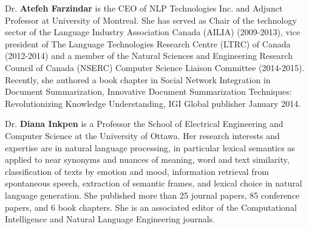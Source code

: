 \begin{bio}

Dr. \textbf{Atefeh Farzindar} is the CEO of NLP Technologies Inc.
and Adjunct Professor at University of Montreal. She has served as
Chair of the technology sector of the Language Industry Association
Canada (AILIA) (2009-2013), vice president of The Language Technologies
Research Centre (LTRC) of Canada (2012-2014) and a member of the Natural
Sciences and Engineering Research Council of Canada (NSERC) Computer
Science Liaison Committee (2014-2015). Recently, she authored a book
chapter in Social Network Integration in Document Summarization, Innovative
Document Summarization Techniques: Revolutionizing Knowledge Understanding,
IGI Global publisher January 2014.

Dr. \textbf{Diana Inkpen} is a Professor the School of Electrical
Engineering and Computer Science at the University of Ottawa. Her
research interests and expertise are in natural language processing,
in particular lexical semantics as applied to near synonyms and nuances
of meaning, word and text similarity, classification of texts by emotion
and mood, information retrieval from spontaneous speech, extraction
of semantic frames, and lexical choice in natural language generation.
She published more than 25 journal papers, 85 conference papers, and
6 book chapters. She is an associated editor of the Computational
Intelligence and Natural Language Engineering journals.

  

\end{bio}

